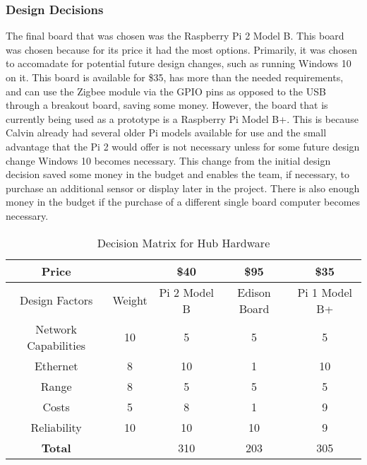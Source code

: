 \documentclass[PPFS.tex]{template/subfiles}
\begin{document}
\subsubsection{Design Decisions}
The final board that was chosen was the Raspberry Pi 2 Model B. This board was chosen because for its price it had the most options. Primarily, it was chosen to accomadate for potential future design changes, such as running Windows 10 on it. This board is available for \$35, has more than the needed requirements, and can use the Zigbee module via the GPIO pins as opposed to the USB through a breakout board, saving some money. However, the board that is currently being used as a prototype is a Raspberry Pi Model B+. This is because Calvin already had several older Pi models available for use and the small advantage that the Pi 2 would offer is not necessary unless for some future design change Windows 10 becomes necessary. This change from the initial design decision saved some money in the budget and enables the team, if necessary, to purchase an additional sensor or display later in the project. There is also enough money in the budget if the purchase of a different single board computer becomes necessary.

       \begin{table}[h!]
       	\begin{center}
       		\caption{Decision Matrix for Hub Hardware}
       		\label{tab:hubMatrix}
       		\begin{tabular}{|c|c|c|c|c|}
       			\hline
       			Price && \$40 & \$95 & \$35 \\
       			\hline
       			Design Factors & Weight & Pi 2 Model B & Edison Board & Pi 1 Model B+ \\
       			\hline
       			Network Capabilities & 10 & 5 & 5 & 5\\
       			\hline
       			Ethernet & 8 & 10 & 1 & 10 \\
       			\hline
       			Range & 8 & 5 & 5 & 5 \\
       			\hline
       			Costs & 5 & 8 & 1 & 9 \\
       			\hline
       			Reliability & 10 & 10 & 10 & 9 \\
       			\hline
       			\textbf{Total} && 310 & 203 & 305 \\
       			\hline
       		\end{tabular}
       	\end{center}
       \end{table}
\end{document}
